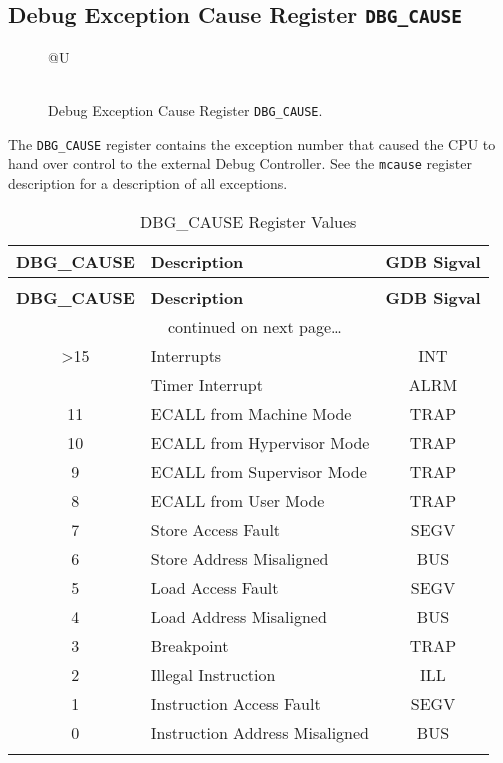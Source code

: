 \subsection{Debug Exception Cause Register
\texttt{DBG\_CAUSE}}\label{debug-exception-cause-register-dbg_cause}

\ifdefined\MARKDOWN
\else

\begin{figure*}[htb!]
	{\footnotesize
		\begin{center}
			\begin{tabular}{@{}U}
				 \\
				\hline
				  \\
				\hline
			\end{tabular}
		\end{center}
	}
	\vspace{-0.1in}
	\caption{Debug Exception Cause Register \texttt{DBG\_CAUSE}.}
	\label{fig:dbgcausereg}
\end{figure*}

\fi

The \texttt{DBG\_CAUSE} register contains the exception number that caused the
CPU to hand over control to the external Debug Controller. See the
\texttt{mcause} register description for a description of all exceptions.

\begin{longtable}[]{@{}clc@{}}
	\toprule
	\textbf{DBG\_CAUSE} & \textbf{Description}           & \textbf{GDB Sigval}\tabularnewline
	\midrule
\ifdefined\MARKDOWN
	\endhead
\else
	\endfirsthead
	\multicolumn{3}{c}{{(Continued from previous page)}} \\
	\toprule
	\textbf{DBG\_CAUSE} & \textbf{Description}           & \textbf{GDB Sigval}\tabularnewline
	\midrule
	\endhead
	\midrule \multicolumn{3}{c}{{\tablename\ \thetable{} continued on next page\ldots}} \\
	\endfoot
	\endlastfoot

\fi
	\textgreater{}15    & Interrupts                     & INT\tabularnewline
	                    & Timer Interrupt                & ALRM\tabularnewline
	11                  & ECALL from Machine Mode        & TRAP\tabularnewline
	10                  & ECALL from Hypervisor Mode     & TRAP\tabularnewline
	9                   & ECALL from Supervisor Mode     & TRAP\tabularnewline
	8                   & ECALL from User Mode           & TRAP\tabularnewline
	7                   & Store Access Fault             & SEGV\tabularnewline
	6                   & Store Address Misaligned       & BUS\tabularnewline
	5                   & Load Access Fault              & SEGV\tabularnewline
	4                   & Load Address Misaligned        & BUS\tabularnewline
	3                   & Breakpoint                     & TRAP\tabularnewline
	2                   & Illegal Instruction            & ILL\tabularnewline
	1                   & Instruction Access Fault       & SEGV\tabularnewline
	0                   & Instruction Address Misaligned & BUS\tabularnewline
	\bottomrule
	\caption{DBG\_CAUSE Register Values}
\end{longtable}

